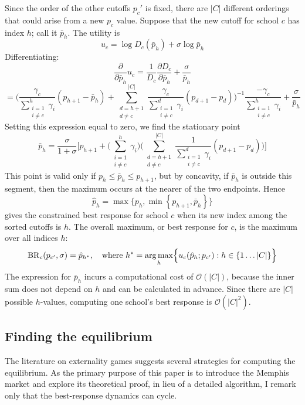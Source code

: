 \documentclass[12pt]{article}
\numberwithin{equation}{subsection}
\theoremstyle{definition}
\DeclareMathOperator*{\argmax}{arg\,max}
\begin{document}
Since the order of the other cutoffs $p_c'$ is fixed, there are $|C|$ different orderings that could arise from a new $p_c$ value. Suppose that the new cutoff for school $c$ has index $h$; call it $\bar p_h$. The utility is
\[u_c = \log D_c(\bar p_h)  + \sigma \log \bar p_h \]
Differentiating:
\[\frac{\partial}{\partial \bar p_h} u_c = \frac{1}{D_c} \frac{\partial D_c}{\partial \bar p_h} + \frac{\sigma}{\bar p_h}\]
\[= \Biggl({
\frac{\gamma_c}{ \sum_{\substack{i=1\\i\neq c}}^h \gamma_i} 
\left(p_{h+1} - \bar p_h \right) +
\sum_{\substack{d=h+1\\d\neq c}}^{|C|} 
\frac{\gamma_c}{ \sum_{\substack{i=1\\i\neq c}}^d \gamma_i} 
\left(p_{d+1} - p_{d}\right)} \Biggr)^{-1}
\frac{-\gamma_c}{ \sum_{\substack{i=1\\i\neq c}}^h \gamma_i}
+ \frac{\sigma}{\bar p_h}
\]
Setting this expression equal to zero, we find the stationary point
\[\bar p_h = \frac{\sigma}{1 + \sigma}\Biggl[ p_{h+1} + \Biggl(\sum_{\substack{i=1\\i\neq c}}^h \gamma_i \Biggr) \Biggl(
\sum_{\substack{d=h+1\\d\neq c}}^{|C|} 
\frac{1}{ \sum_{\substack{i=1\\i\neq c}}^d \gamma_i} 
\left(p_{d+1} - p_{d}\right)
\Biggr)\Biggr]\]
This point is valid only if $p_{h} \leq \bar p_h \leq p_{h+1}$, but by concavity, if $\bar p_h$ is outside this segment, then the maximum occurs at the nearer of the two endpoints. Hence
\[\hat p_h = \max \bigl\{ p_{h},  \min \left\{ p_{h+1}, \bar p_h \right\}\bigr\} \]
gives the constrained best response for school $c$ when its new index among the sorted cutoffs is $h$. The overall maximum, or  best response for $c$, is the maximum over all indices $h$:
\begin{align} \label{brforc}
\operatorname{BR}_c  (p_{c'} , \sigma)  =  \hat p_{h^*},\quad \text{where } h^* = \argmax_h \Bigl\{ u_c(\hat p_h; p_{c'}): h \in \left\{ 1 \dots |C| \right\} \Bigr\}
\end{align}
The expression for $\bar p_h$ incurs a computational cost of $\mathcal{O}(|C|)$, because the inner sum does not depend on $h$ and can be calculated in advance. Since there are $|C|$ possible $h$-values, computing one school's best response is $\mathcal{O}(|C|^2)$.

\subsection{Finding the equilibrium}
The literature on externality games suggests several strategies for computing the equilibrium. As the primary purpose of this paper is to introduce the Memphis market and explore its theoretical proof, in lieu of a detailed algorithm, I remark only that the best-response dynamics can cycle. 
\end{document}
